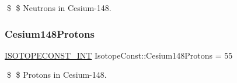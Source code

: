 \$ \$ Neutrons in Cesium-\/148. \mbox{\label{group___isotope_const-_cesium-_cs148_ga833dfc271794e45d98d52f19474aa1b7}} 
\subsubsection{\texorpdfstring{Cesium148\+Protons}{Cesium148Protons}}
{\footnotesize\ttfamily \mbox{\hyperlink{group___isotope_const-_macros_ga5f18360b3e99483a35c32d789e62621c}{I\+S\+O\+T\+O\+P\+E\+C\+O\+N\+S\+T\+\_\+\+I\+NT}} Isotope\+Const\+::\+Cesium148\+Protons = 55}

\$ \$ Protons in Cesium-\/148. 